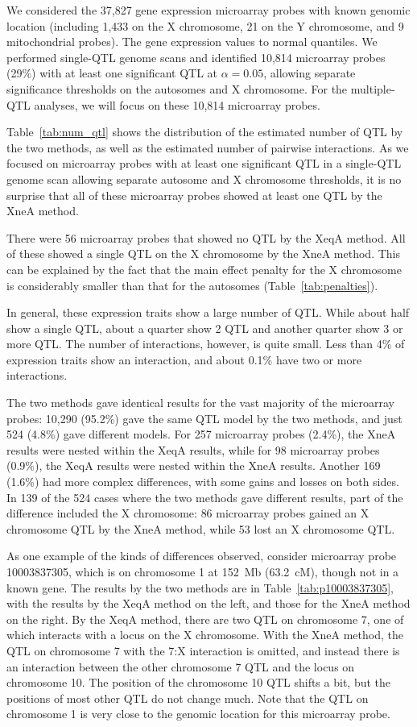\documentclass[12pt,letterpaper]{article}
\begin{document}
We considered the 37,827 gene expression microarray probes with known
genomic location (including 1,433 on the X chromosome, 21 on the Y
chromosome, and 9 mitochondrial probes). The gene
expression values to normal quantiles. We performed single-QTL genome
scans and identified 10,814 microarray probes (29\%) with at least one
significant QTL at $\alpha=0.05$, allowing separate significance
thresholds on the autosomes and X chromosome. For the multiple-QTL
analyses, we will focus on these 10,814 microarray probes.

Table~\ref{tab:num_qtl} shows the distribution of the estimated number
of QTL by the two methods, as well as the estimated number of pairwise
interactions. As we focused on microarray probes with at least one
significant QTL in a single-QTL genome scan allowing separate autosome
and X chromosome thresholds, it is no surprise that all of these
microarray probes showed at least one QTL by the XneA method.

There were 56 microarray probes that showed no QTL by the XeqA method.
All of these showed a single QTL on the X chromosome by the XneA
method. This can be explained by the fact that the main effect penalty
for the X chromosome is considerably smaller than that for the
autosomes (Table~\ref{tab:penalties}).

In general, these expression traits show a large number of QTL. While
about half show a single QTL, about a quarter show 2 QTL and another
quarter show 3 or more QTL. The number of interactions, however, is
quite small. Less than 4\% of expression traits show an interaction,
and about 0.1\% have two or more interactions.

The two methods gave identical results for the vast majority of the
microarray probes: 10,290 (95.2\%) gave the same QTL model by the two
methods, and just 524 (4.8\%) gave different models. For 257
microarray probes (2.4\%), the XneA results were nested within the
XeqA results, while for 98 microarray probes (0.9\%), the XeqA results
were nested within the XneA results. Another 169 (1.6\%) had more
complex differences, with some gains and losses on both sides.
In 139 of the 524 cases where the two methods gave different results,
part of the difference included the X chromosome: 86 microarray probes
gained an X chromosome QTL by the XneA method, while 53 lost an X
chromosome QTL.

As one example of the kinds of differences observed, consider
microarray probe 10003837305, which is on chromosome 1 at 152~Mb
(63.2~cM), though not in a known gene. The results by the two methods
are in Table~\ref{tab:p10003837305}, with the results by the XeqA
method on the left, and those for the XneA method on the right.
By the XeqA method, there are two QTL on chromosome 7, one of which
interacts with a locus on the X chromosome. With the XneA method, the
QTL on chromosome 7 with the 7:X interaction is omitted, and instead
there is an interaction between the other chromosome 7 QTL and the
locus on chromosome 10. The position of the chromosome 10 QTL shifts a
bit, but the positions of most other QTL do not change much. Note that
the QTL on chromosome 1 is very close to the genomic location for this
microarray probe.
\end{document}
